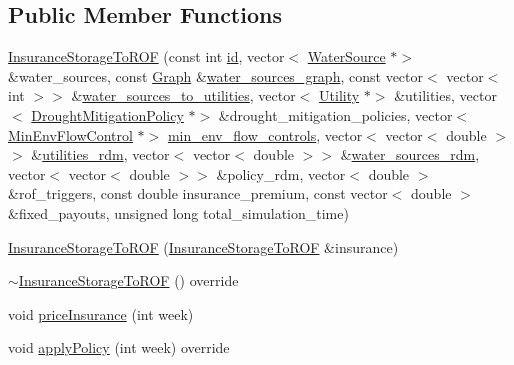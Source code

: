 \subsection*{Public Member Functions}
\begin{DoxyCompactItemize}
\item 
\mbox{\hyperlink{classInsuranceStorageToROF_a7769ebf2a6c73fa0efc55268712e8157}{Insurance\+Storage\+To\+R\+OF}} (const int \mbox{\hyperlink{classDroughtMitigationPolicy_abf3ed19ed98e0d74dc9ae24094be640b}{id}}, vector$<$ \mbox{\hyperlink{classWaterSource}{Water\+Source}} $\ast$$>$ \&water\+\_\+sources, const \mbox{\hyperlink{classGraph}{Graph}} \&\mbox{\hyperlink{classContinuityModel_a563401588c6fa622f03393909a3522db}{water\+\_\+sources\+\_\+graph}}, const vector$<$ vector$<$ int $>$$>$ \&\mbox{\hyperlink{classContinuityModel_ae8516bcbbf52650190277fc8b06c1843}{water\+\_\+sources\+\_\+to\+\_\+utilities}}, vector$<$ \mbox{\hyperlink{classUtility}{Utility}} $\ast$$>$ \&utilities, vector$<$ \mbox{\hyperlink{classDroughtMitigationPolicy}{Drought\+Mitigation\+Policy}} $\ast$$>$ \&drought\+\_\+mitigation\+\_\+policies, vector$<$ \mbox{\hyperlink{classMinEnvFlowControl}{Min\+Env\+Flow\+Control}} $\ast$$>$ \mbox{\hyperlink{classContinuityModel_afc991e5c0d144020e49a97751a04b302}{min\+\_\+env\+\_\+flow\+\_\+controls}}, vector$<$ vector$<$ double $>$$>$ \&\mbox{\hyperlink{classContinuityModel_aa4a00b76da6295d2faa11e3dcaea1896}{utilities\+\_\+rdm}}, vector$<$ vector$<$ double $>$$>$ \&\mbox{\hyperlink{classContinuityModel_ab7b8fa93a6f56b328e425e1ead6cfefa}{water\+\_\+sources\+\_\+rdm}}, vector$<$ vector$<$ double $>$$>$ \&policy\+\_\+rdm, vector$<$ double $>$ \&rof\+\_\+triggers, const double insurance\+\_\+premium, const vector$<$ double $>$ \&fixed\+\_\+payouts, unsigned long total\+\_\+simulation\+\_\+time)
\item 
\mbox{\hyperlink{classInsuranceStorageToROF_a5229c6bbb6da8268017c71bacec70f67}{Insurance\+Storage\+To\+R\+OF}} (\mbox{\hyperlink{classInsuranceStorageToROF}{Insurance\+Storage\+To\+R\+OF}} \&insurance)
\item 
\mbox{\hyperlink{classInsuranceStorageToROF_aba2143897e3ec32d698d25a1aa572a73}{$\sim$\+Insurance\+Storage\+To\+R\+OF}} () override
\item 
void \mbox{\hyperlink{classInsuranceStorageToROF_a2519f93b9db551105d9a7913d0db9540}{price\+Insurance}} (int week)
\item 
void \mbox{\hyperlink{classInsuranceStorageToROF_a17aa84e0559793b3c463c468dfda3753}{apply\+Policy}} (int week) override
\item 

\end{DoxyCompactItemize}
